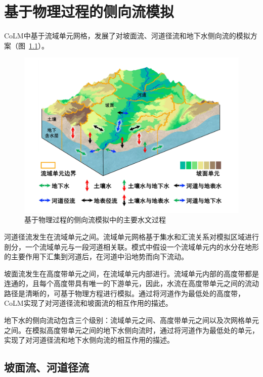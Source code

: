 \chapter{基于物理过程的侧向流模拟}\label{ch:侧向流模拟}

CoLM中基于流域单元网格，发展了对坡面流、河道径流和地下水侧向流的模拟方案（图~\ref{fig:主要水文过程}）。

{
\begin{figure}[htbp]
\centering
\includegraphics[width=\textwidth]{Figures/侧向流/主要水文过程.jpg}
\caption{基于物理过程的侧向流模拟中的主要水文过程}
\label{fig:主要水文过程}
\end{figure}
}

河道径流发生在流域单元之间。流域单元网格基于集水和汇流关系对模拟区域进行剖分，一个流域单元与一段河道相关联。模式中假设一个流域单元内的水分在地形的主要作用下汇集到河道后，在河道中沿地势而向下流动。

坡面流发生在高度带单元之间，在流域单元内部进行。流域单元内部的高度带都是连通的，且每个高度带具有唯一的下游单元，因此，水流在高度带单元之间的流动路径是清晰的，可基于物理方程进行模拟。通过将河道作为最低处的高度带，CoLM实现了对河道径流和坡面流的相互作用的描述。

地下水的侧向流动包含三个级别：流域单元之间、高度带单元之间以及次网格单元之间。在模拟高度带单元之间的地下水侧向流时，通过将河道作为最低处的单元，实现了对河道径流和地下水侧向流的相互作用的描述。

\section{坡面流、河道径流}

